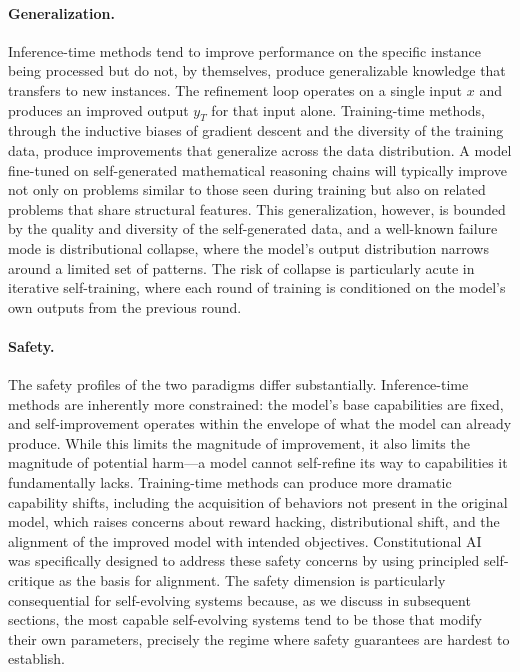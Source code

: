 \paragraph{Generalization.}
Inference-time methods tend to improve performance on the specific instance being processed but do not, by themselves, produce generalizable knowledge that transfers to new instances. The refinement loop operates on a single input $x$ and produces an improved output $y_T$ for that input alone. Training-time methods, through the inductive biases of gradient descent and the diversity of the training data, produce improvements that generalize across the data distribution. A model fine-tuned on self-generated mathematical reasoning chains will typically improve not only on problems similar to those seen during training but also on related problems that share structural features. This generalization, however, is bounded by the quality and diversity of the self-generated data, and a well-known failure mode is distributional collapse, where the model's output distribution narrows around a limited set of patterns. The risk of collapse is particularly acute in iterative self-training, where each round of training is conditioned on the model's own outputs from the previous round.

\paragraph{Safety.}
The safety profiles of the two paradigms differ substantially. Inference-time methods are inherently more constrained: the model's base capabilities are fixed, and self-improvement operates within the envelope of what the model can already produce. While this limits the magnitude of improvement, it also limits the magnitude of potential harm---a model cannot self-refine its way to capabilities it fundamentally lacks. Training-time methods can produce more dramatic capability shifts, including the acquisition of behaviors not present in the original model, which raises concerns about reward hacking, distributional shift, and the alignment of the improved model with intended objectives. Constitutional AI~\citep{bai2022constitutional} was specifically designed to address these safety concerns by using principled self-critique as the basis for alignment. The safety dimension is particularly consequential for self-evolving systems because, as we discuss in subsequent sections, the most capable self-evolving systems tend to be those that modify their own parameters, precisely the regime where safety guarantees are hardest to establish.

